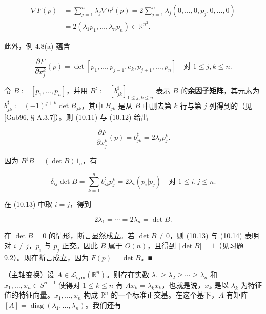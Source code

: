 \begin{example}
\begin{items}
\begin{subitems}
\begin{equation}
\begin{aligned}
\nabla F(p) &= \sum_{j=1}^{n}\lambda_{j}\nabla h^{j}(p) = 2\sum_{j=1}^{n}\lambda_{j}(0, \ldots, 0, p_{j}, 0, \ldots, 0) \\ &= 2(\lambda_{1}p_{1}, \ldots, \lambda_{n}p_{n}) \in \mathbb{R}^{n^{2}} .
\end{aligned}\tag{10.11}
\end{equation}

此外，例 4.8(a) 蕴含

\begin{equation}
\frac{\partial F}{\partial x_{j}^{k}}(p) = \det[p_{1}, \ldots, p_{j-1}, e_{k}, p_{j+1}, \ldots, p_{n}] \quad \text{对 } 1 \le j,k \le n .\tag{10.12}
\end{equation}

令 $ B := [p_{1}, \ldots, p_{n}] $，并用 $ B^{\sharp} := [b_{jk}^{\sharp}]_{1\le j,k\le n} $ 表示 $ B $ 的\textbf{余因子矩阵}，其元素为 $ b_{jk}^{\sharp} := (-1)^{j+k}\det B_{jk} $，其中 $ B_{jk} $ 是从 $ B $ 中删去第 $ k $ 行与第 $ j $ 列得到的（见 [Gab96, § A.3.7]）。则 (10.11) 与 (10.12) 给出

\[
\frac{\partial F}{\partial x_{j}^{k}}(p) = b_{jk}^{\sharp} = 2\lambda_{j}p_{j}^{k} .
\]

因为 $ B^{\sharp}B = (\det B)1_{n} $，有

\begin{equation}
\delta_{ij}\det B = \sum_{k=1}^{n}b_{ik}^{\sharp}p_{j}^{k} = 2\lambda_{i}(p_{i}|p_{j}) \quad \text{对 } 1 \le i,j \le n .\tag{10.13}
\end{equation}

在 (10.13) 中取 $ i = j $，得到

\begin{equation}
2\lambda_{1} = \cdots = 2\lambda_{n} = \det B .\tag{10.14}
\end{equation}

在 $ \det B = 0 $ 的情形，断言显然成立。若 $ \det B \ne 0 $，则 (10.13) 与 (10.14) 表明对 $ i \ne j $，$ p_{i} $ 与 $ p_{j} $ 正交。因此 $ B $ 属于 $ O(n) $，且得到 $ |\det B| = 1 $（见习题 9.2）。现在断言成立，因为 $ F(p) = \det B $。\nobreak\hspace{0.35em}■

\end{subitems}

\item

（主轴变换）设 $ A \in \mathcal{L}_{\mathrm{sym}}(\mathbb{R}^{n}) $。则存在实数 $ \lambda_{1} \ge \lambda_{2} \ge \cdots \ge \lambda_{n} $ 和 $ x_{1}, \ldots, x_{n} \in S^{n-1} $ 使得对 $ 1 \le k \le n $ 有 $ Ax_{k} = \lambda_{k}x_{k} $，也就是说，$ x_{k} $ 是以 $ \lambda_{k} $ 为特征值的特征向量。$ x_{1}, \ldots, x_{n} $ 构成 $ \mathbb{R}^{n} $ 的一个标准正交基。在这个基下，$ A $ 有矩阵 $ [A] = \operatorname{diag}(\lambda_{1}, \ldots, \lambda_{n}) $。我们还有


\end{items}
\end{example}
